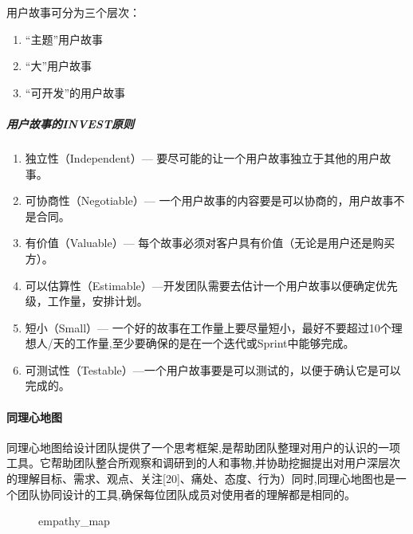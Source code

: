 \documentclass[letterpaper,10pt,english]{sphinxmanual}
\begin{document}
用户故事可分为三个层次：
\begin{enumerate}
%
\item {} 
“主题”用户故事

\item {} 
“大”用户故事

\item {} 
“可开发”的用户故事

\end{enumerate}


\subparagraph{用户故事的INVEST原则}
\label{\detokenize{chapter_knowledge/users_analysis:invest}}\begin{enumerate}
%
\item {} 
独立性（Independent）— 要尽可能的让一个用户故事独立于其他的用户故事。

\item {} 
可协商性（Negotiable）—
一个用户故事的内容要是可以协商的，用户故事不是合同。

\item {} 
有价值（Valuable）—
每个故事必须对客户具有价值（无论是用户还是购买方）。

\item {} 
可以估算性（Estimable）—开发团队需要去估计一个用户故事以便确定优先级，工作量，安排计划。

\item {} 
短小（Small）—
一个好的故事在工作量上要尽量短小，最好不要超过10个理想人/天的工作量,至少要确保的是在一个迭代或Sprint中能够完成。

\item {} 
可测试性（Testable）—一个用户故事要是可以测试的，以便于确认它是可以完成的。

\end{enumerate}


\paragraph{同理心地图}
\label{\detokenize{chapter_knowledge/users_analysis:id10}}
同理心地图给设计团队提供了一个思考框架,是帮助团队整理对用户的认识的一项工具。它帮助团队整合所观察和调研到的人和事物,并协助挖掘提出对用户深层次的理解目标、需求、观点、关注{[}20{]}、痛处、态度、行为）同时,同理心地图也是一个团队协同设计的工具,确保每位团队成员对使用者的理解都是相同的。

\begin{figure}[H]
\centering
\capstart

\noindent{}
\caption{empathy\_map}\label{\detokenize{chapter_knowledge/users_analysis:id37}}\end{figure}
\end{document}
